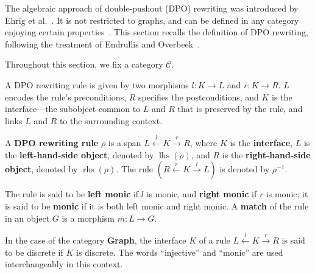 The algebraic approach of double-pushout (DPO) rewriting was introduced by Ehrig et al.~\cite{ehrig1973graph}. It is not restricted to graphs, and can be defined in any category enjoying certain properties~\cite{ehrig2006fundamentals,lack2004adhesive}. This section recalls the definition of DPO rewriting, following the treatment of Endrullis and Overbeek~\cite{endrullis2024generalized_icgt}.

Throughout this section, we fix a category \( \mathcal{C} \).

 A DPO rewriting rule is given by two morphisms \(l: K \mathop{\to} L\) and \(r: K \mathop{\to} R\). \(L\) encodes the rule's preconditions, \(R\) specifies the postconditions, and \(K\) is the interface—the subobject common to \(L\) and \(R\) that is preserved by the rule, and links \(L\) and \(R\) to the surrounding context.
\begin{definition} 
  \label{def:grs:dpo_rule}
A \textbf{DPO rewriting rule} $\rho$ is a span \( L \overset{l}{\leftarrow} K \overset{r}{\rightarrow} R \), where \( K \) is the \textbf{interface}, \( L \) is the \textbf{left-hand-side object}, denoted by \( \operatorname{lhs}(\rho) \), and \( R \) is the \textbf{right-hand-side object}, denoted by \( \operatorname{rhs}(\rho) \). The rule $(R \overset{r}{\leftarrow} K \overset{l}{\rightarrow} L)$ is denoted by $\rho^{-1}$. 

The rule is said to be \textbf{left monic} if \( l \) is monic, and \textbf{right monic} if \( r \) is monic; 
it is said to be \textbf{monic} if it is both left monic and right monic.
A \textbf{match} of the rule in an object \( G \) is a morphism \( m: L \mathop{\rightarrow} G \). 
\end{definition}
In the case of the category \textbf{Graph}, 
the interface $K$ of a rule \( L \overset{l}{\leftarrow} K \overset{r}{\rightarrow} R \) is said to be discrete if $K$ is discrete.
The words \enquote{injective} and \enquote{monic} are used interchangeably in this context.

